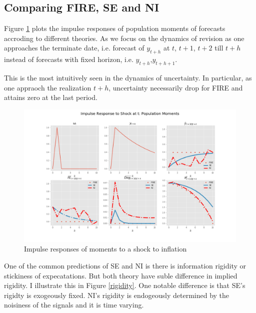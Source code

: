 \documentclass[]{article}
\begin{document}
\subsection{Comparing FIRE, SE and NI}

Figure \ref{ir_pop} plots the impulse responses of population moments of forecasts accroding to different theories. As we focus on the dynamics of revision as one approaches the terminate date, i.e. forecast of $y_{t+h}$ at $t$, $t+1$, $t+2$ till $t+h$ instead of forecasts with fixed horizon, i.e. $y_{t+h}$,$y_{t+h+1}$. 

This is the most intuitively seen in the dynamics of uncertainty. In particular, as one appraoch the realization $t+h$, uncertainty necessarily drop for FIRE and attains zero at the last period.  

\begin{figure}[ht]
	\centering
	\includegraphics[width=16cm]{figures/ir_popseni.png} 
	\caption{Impulse responses of moments to a shock to inflation}
	\label{ir_pop}
\end{figure}

One of the common predictions of SE and NI is there is information rigidity or stickiness of expecatations.  But both theory have suble difference in implied rigidity. I illustrate this in Figure \ref{rigidity}. One notable difference is that SE's rigidty is exogeously fixed. NI's rigidity is endogeously determined by the noisiness of the signals and it is time varying. 
 
\end{document}
